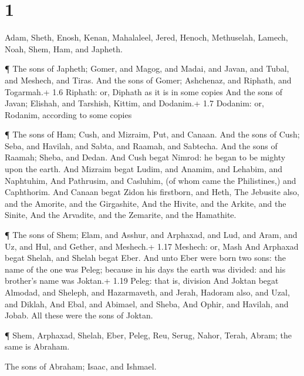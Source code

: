 \hypertarget{section}{%
\section{1}\label{section}}

 Adam, Sheth, Enosh,  Kenan, Mahalaleel, Jered,
 Henoch, Methuselah, Lamech,  Noah, Shem, Ham,
and Japheth.

 ¶ The sons of Japheth; Gomer, and Magog, and Madai, and
Javan, and Tubal, and Meshech, and Tiras.  And the sons of
Gomer; Ashchenaz, and Riphath, and Togarmah.+ 1.6 Riphath: or, Diphath
as it is in some copies  And the sons of Javan; Elishah, and
Tarshish, Kittim, and Dodanim.+ 1.7 Dodanim: or, Rodanim, according to
some copies

 ¶ The sons of Ham; Cush, and Mizraim, Put, and Canaan.
 And the sons of Cush; Seba, and Havilah, and Sabta, and
Raamah, and Sabtecha. And the sons of Raamah; Sheba, and Dedan.
 And Cush begat Nimrod: he began to be mighty upon the
earth.  And Mizraim begat Ludim, and Anamim, and Lehabim,
and Naphtuhim,  And Pathrusim, and Casluhim, (of whom came
the Philistines,) and Caphthorim.  And Canaan begat Zidon
his firstborn, and Heth,  The Jebusite also, and the
Amorite, and the Girgashite,  And the Hivite, and the
Arkite, and the Sinite,  And the Arvadite, and the
Zemarite, and the Hamathite.

 ¶ The sons of Shem; Elam, and Asshur, and Arphaxad, and
Lud, and Aram, and Uz, and Hul, and Gether, and Meshech.+ 1.17 Meshech:
or, Mash  And Arphaxad begat Shelah, and Shelah begat Eber.
 And unto Eber were born two sons: the name of the one was
Peleg; because in his days the earth was divided: and his brother's name
was Joktan.+ 1.19 Peleg: that is, division  And Joktan
begat Almodad, and Sheleph, and Hazarmaveth, and Jerah, 
Hadoram also, and Uzal, and Diklah,  And Ebal, and Abimael,
and Sheba,  And Ophir, and Havilah, and Jobab. All these
were the sons of Joktan.

 ¶ Shem, Arphaxad, Shelah,  Eber, Peleg, Reu,
 Serug, Nahor, Terah,  Abram; the same is
Abraham.

 The sons of Abraham; Isaac, and Ishmael.

